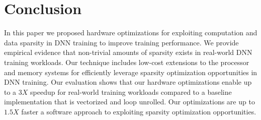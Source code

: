 \section{Conclusion}
\label{sec:conclude}

In this paper we proposed hardware optimizations for exploiting computation and data sparsity in DNN training to improve training performance.  We provide empirical evidence that non-trivial amounts of sparsity exists in real-world DNN training workloads.  Our technique includes low-cost extensions to the processor and memory systems for efficiently leverage sparsity optimization opportunities in DNN training.  Our evaluation shows that our hardware optimizations enable up to a $3X$ speedup for real-world training workloads compared to a baseline implementation that is vectorized and loop unrolled.  Our optimizations are up to $1.5X$ faster a software approach to exploiting sparsity optimization opportunities. 
